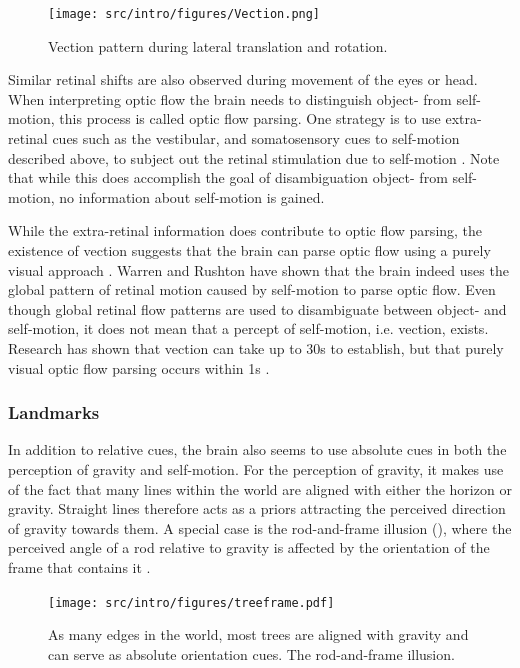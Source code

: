 \begin{figure}
    \texttt{[image: src/intro/figures/Vection.png]}

    \caption{Vection pattern during  lateral translation and  rotation.}
    \label{intro:fig2}
\end{figure}

Similar retinal shifts are also observed during movement of the eyes or head. When interpreting optic flow the brain needs to distinguish object- from self-motion, this process is called optic flow parsing. One strategy is to use extra-retinal cues such as the vestibular, and somatosensory cues to self-motion described above, to subject out the retinal stimulation due to self-motion \cite{wertheim1994,wexler2001,macneilage2012}. Note that while this does accomplish the goal of disambiguation object- from self-motion, no information about self-motion is gained.

While the extra-retinal information does contribute to optic flow parsing, the existence of vection \cite{dichgans1978} suggests that the brain can parse optic flow using a purely visual approach \cite{rushton2005,warren2007}. Warren and Rushton \citeyear{warren2009} have shown that the brain indeed uses the global pattern of retinal motion caused by self-motion to parse optic flow. Even though global retinal flow patterns are used to disambiguate between object- and self-motion, it does not mean that a percept of self-motion, i.e. vection, exists. Research has shown that vection can take up to 30s to establish, but that purely visual optic flow parsing occurs within 1s \cite{warren2009}.

\subsubsection{Landmarks}
In addition to relative cues, the brain also seems to use absolute cues in both the perception of gravity and self-motion. For the perception of gravity, it makes use of the fact that many lines within the world are aligned with either the horizon or gravity. Straight lines therefore acts as a priors attracting the perceived direction of gravity towards them. A special case is the rod-and-frame illusion (), where the perceived angle of a rod relative to gravity is affected by the orientation of the frame that contains it \cite{witkin1948}. 

\begin{figure}
	\texttt{[image: src/intro/figures/treeframe.pdf]}
	\caption{ As many edges in the world, most trees are aligned with gravity and can serve as absolute orientation cues.   The rod-and-frame illusion.}
	\label{intro:fig9}
\end{figure}

